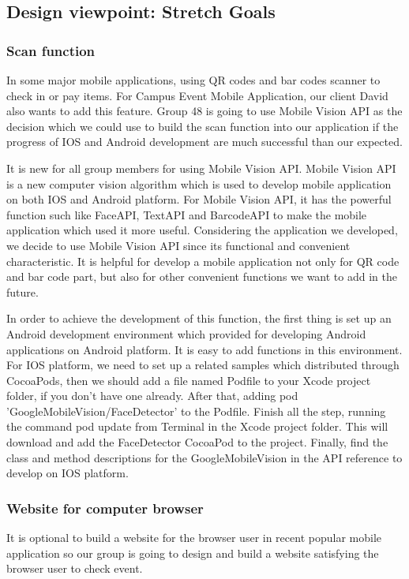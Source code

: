 \documentclass[letterpaper, 10pt,titlepage]{article}
\begin{document}
\subsection{Design viewpoint: Stretch Goals}
\subsubsection{Scan function}
In some major mobile applications, using QR codes and bar codes scanner to check in or pay items. For Campus Event Mobile Application, our client David also wants to add this feature. Group 48 is going to use Mobile Vision API as the decision which we could use to build the scan function into our application if the progress of IOS and Android development are much successful than our expected. 

It is new for all group members for using Mobile Vision API. Mobile Vision API is a new computer vision algorithm which is used to develop mobile application on both IOS and Android platform. For Mobile Vision API, it has the powerful function such like FaceAPI, TextAPI and BarcodeAPI to make the mobile application which used it more useful. Considering the application we developed, we decide to use Mobile Vision API since its functional and convenient characteristic. It is helpful for develop a mobile application not only for QR code and bar code part, but also for other convenient functions we want to add in the future.

In order to achieve the development of this function, the first thing is set up an Android development environment which provided for developing Android applications on Android platform. It is easy to add functions in this environment. For IOS platform, we need to set up a related samples which distributed through CocoaPods, then we should add a file named Podfile to your Xcode project folder, if you don't have one already. After that, adding pod 'GoogleMobileVision/FaceDetector' to the Podfile. Finish all the step, running the command pod update from Terminal in the Xcode project folder. This will download and add the FaceDetector CocoaPod to the project. Finally, find the class and method descriptions for the GoogleMobileVision in the API reference to develop on IOS platform.\cite{mobilevisionapi}

\subsubsection{Website for computer browser}
It is optional to build a website for the browser user in recent popular mobile application so our group is going to design and build a website satisfying the browser user to check event.
\end{document}
